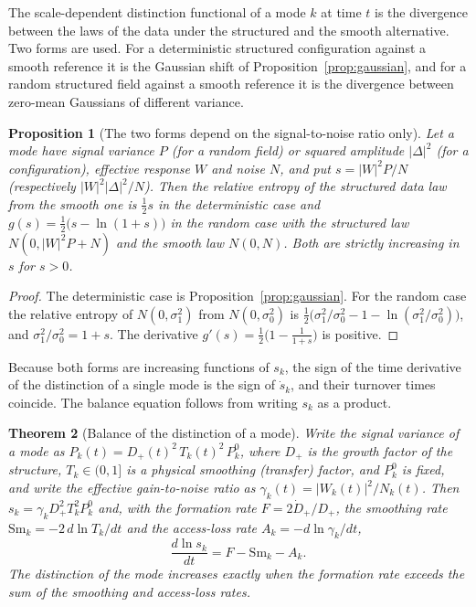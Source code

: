 \documentclass[11pt,oneside]{book}
\newtheorem{theorem}{Theorem}[chapter]
\newtheorem{proposition}[theorem]{Proposition}
\theoremstyle{definition}
\theoremstyle{remark}
\begin{document}
The scale-dependent distinction functional of a mode $k$ at time $t$ is the divergence between the laws of the data under the structured and the smooth alternative. Two forms are used. For a deterministic structured configuration against a smooth reference it is the Gaussian shift of Proposition~\ref{prop:gaussian}, and for a random structured field against a smooth reference it is the divergence between zero-mean Gaussians of different variance.

\begin{proposition}[The two forms depend on the signal-to-noise ratio only]\label{prop:two-forms}
Let a mode have signal variance $P$ (for a random field) or squared amplitude $|\Delta|^2$ (for a configuration), effective response $W$ and noise $N$, and put $s=|W|^2P/N$ (respectively $|W|^2|\Delta|^2/N$). Then the relative entropy of the structured data law from the smooth one is $\tfrac12 s$ in the deterministic case and $g(s)=\tfrac12\bigl(s-\ln(1+s)\bigr)$ in the random case with the structured law $N(0,|W|^2P+N)$ and the smooth law $N(0,N)$. Both are strictly increasing in $s$ for $s>0$.
\end{proposition}

\begin{proof}
The deterministic case is Proposition~\ref{prop:gaussian}. For the random case the relative entropy of $N(0,\sigma_1^2)$ from $N(0,\sigma_0^2)$ is $\tfrac12\bigl(\sigma_1^2/\sigma_0^2-1-\ln(\sigma_1^2/\sigma_0^2)\bigr)$, and $\sigma_1^2/\sigma_0^2=1+s$. The derivative $g'(s)=\tfrac12\bigl(1-\tfrac1{1+s}\bigr)$ is positive.
\end{proof}

Because both forms are increasing functions of $s_k$, the sign of the time derivative of the distinction of a single mode is the sign of $\dot s_k$, and their turnover times coincide. The balance equation follows from writing $s_k$ as a product.

\begin{theorem}[Balance of the distinction of a mode]\label{thm:balance-mode}
Write the signal variance of a mode as $P_k(t)=D_+(t)^2\,T_k(t)^2\,P_k^0$, where $D_+$ is the growth factor of the structure, $T_k\in(0,1]$ is a physical smoothing (transfer) factor, and $P_k^0$ is fixed, and write the effective gain-to-noise ratio as $\gamma_k(t)=|W_k(t)|^2/N_k(t)$. Then $s_k=\gamma_kD_+^2T_k^2P_k^0$ and, with the formation rate $F=2\dot D_+/D_+$, the smoothing rate $\mathrm{Sm}_k=-2\,d\ln T_k/dt$ and the access-loss rate $A_k=-d\ln\gamma_k/dt$,
\[
\frac{d\ln s_k}{dt}=F-\mathrm{Sm}_k-A_k .
\]
The distinction of the mode increases exactly when the formation rate exceeds the sum of the smoothing and access-loss rates.
\end{theorem}
\end{document}
